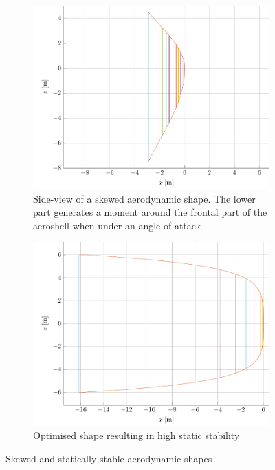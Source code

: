 \begin{figure}[h]
	\begin{subfigure}[t]{0.45\textwidth}
		\centering
		\includegraphics[width=1\textwidth]{./Figure/Aerodynamics/sideview_skewness.pdf}
		\captionsetup{width=0.9\textwidth,skip=-8pt}
		\caption[Side-view of a skewed aerodynamic shape]{Side-view of a skewed aerodynamic shape. The lower part generates a moment around the frontal part of the aeroshell when under an angle of attack}
		\label{fig:skewnessplot}
	\end{subfigure}
	\begin{subfigure}[t]{0.45\textwidth}
		\centering
		\captionsetup{width=0.9\textwidth}		
		\includegraphics[width=1\textwidth]{./Figure/Aerodynamics/sideview_cmalpha.pdf}
		\caption{Optimised shape resulting in high static stability}
		\label{fig:highcmalphashape}
	\end{subfigure}	
	\caption{Skewed and statically stable aerodynamic shapes}
\end{figure}
	

